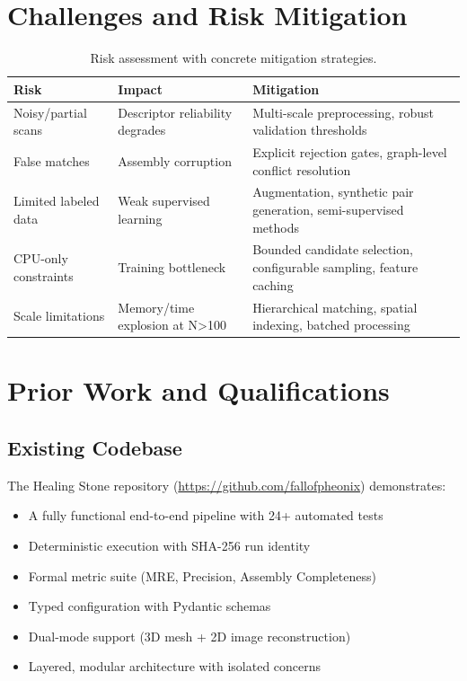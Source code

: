 \documentclass[11pt,a4paper]{article}
\begin{document}
\section{Challenges and Risk Mitigation}

\begin{table}[htbp]
\centering
\begin{tabularx}{\textwidth}{lXX}
\toprule
\textbf{Risk} & \textbf{Impact} & \textbf{Mitigation} \\
\midrule
Noisy/partial scans & Descriptor reliability degrades & Multi-scale preprocessing, robust validation thresholds \\
False matches & Assembly corruption & Explicit rejection gates, graph-level conflict resolution \\
Limited labeled data & Weak supervised learning & Augmentation, synthetic pair generation, semi-supervised methods \\
CPU-only constraints & Training bottleneck & Bounded candidate selection, configurable sampling, feature caching \\
Scale limitations & Memory/time explosion at N>100 & Hierarchical matching, spatial indexing, batched processing \\
\bottomrule
\end{tabularx}
\caption{Risk assessment with concrete mitigation strategies.}
\label{tab:risks}
\end{table}

\section{Prior Work and Qualifications}

\subsection{Existing Codebase}

The Healing Stone repository (\url{https://github.com/fallofpheonix}) demonstrates:
\begin{itemize}[leftmargin=*]
    \item A fully functional end-to-end pipeline with 24+ automated tests
    \item Deterministic execution with SHA-256 run identity
    \item Formal metric suite (MRE, Precision, Assembly Completeness)
    \item Typed configuration with Pydantic schemas
    \item Dual-mode support (3D mesh + 2D image reconstruction)
    \item Layered, modular architecture with isolated concerns
\end{itemize}
\end{document}
